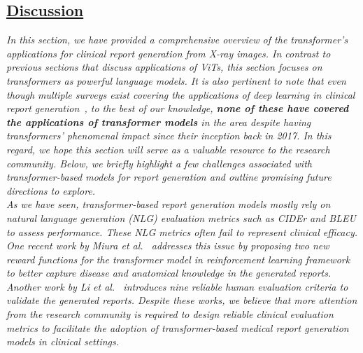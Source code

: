 \documentclass[10pt,journal,compsoc]{IEEEtran}
\begin{document}


\begin{tcolorbox}[top=0.5pt,left=0pt,size=minimal,boxrule = 0pt,breakable, enhanced]%
\subsection{\textbf{\underline{Discussion}}}
\hspace{0.75em}\textit{In this section, we have provided a comprehensive overview of the transformer's applications for clinical report generation from X-ray images. In contrast to previous sections that discuss applications of ViTs, this section focuses on transformers as powerful language models. It is also pertinent to note that even though multiple surveys exist covering the applications of deep learning in clinical report generation~\cite{pavlopoulos2021diagnostic,monshi2020deep,kougia2019survey,messina2020survey}, to the best of our knowledge, \textbf{none of these have covered the applications of transformer models} in the area despite having transformers' phenomenal impact since their inception back in 2017.
In this regard, we hope this section will serve as a valuable resource to the research community. Below, we briefly highlight a few challenges associated with transformer-based models for report generation and outline promising future directions to explore.}
\\
\vspace{0.01em}
\textit{ As we have seen, transformer-based report generation models {mostly rely on natural language generation (NLG) evaluation metrics} such as CIDEr and BLEU to assess performance. These NLG metrics often fail to represent clinical efficacy. One recent work by Miura \textit{et al.}~\cite{miura2020improving} addresses this issue by proposing two new reward functions for the transformer model in reinforcement learning framework to better capture disease and anatomical knowledge in the generated reports. Another work by Li \textit{et al.}~\cite{li2021ffa} introduces nine reliable human evaluation criteria to validate the generated reports. Despite these works, we believe that more attention from the research community is required to design reliable clinical evaluation metrics to facilitate the adoption of transformer-based medical report generation models in clinical settings.}

\end{tcolorbox}
\end{document}
